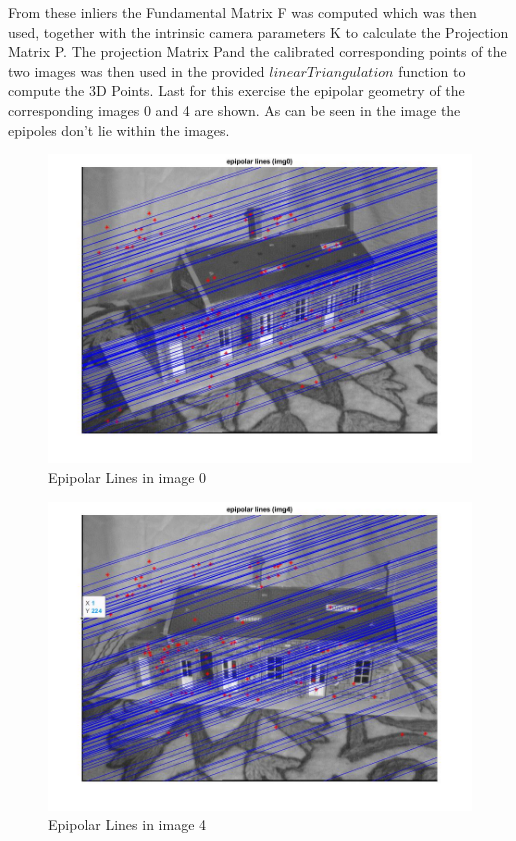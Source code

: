\documentclass[12pt]{article}
\begin{document}
From these inliers the Fundamental Matrix F was computed which was then used, together with the intrinsic camera parameters K to calculate the Projection Matrix P. The projection Matrix Pand the calibrated corresponding points of the two images was then used in the provided $linearTriangulation$ function to compute the 3D Points.  
\newline
Last for this exercise the epipolar geometry of the corresponding images 0 and 4 are shown. As can be seen in the image the epipoles don't lie within the images.
\vspace{5mm}
\begin{figure}[H]
	\centering
	\includegraphics[width=1.1\textwidth]{ep0.jpg}
	\caption{Epipolar Lines in image 0}
	\label{fig1}
\end{figure}
\vspace{5mm}
\vspace{5mm}
\begin{figure}[H]
	\centering
	\includegraphics[width=1.1\textwidth]{ep4.jpg}
	\caption{Epipolar Lines in image 4}
	\label{fig1}
\end{figure}
\vspace{5mm}
\end{document}
